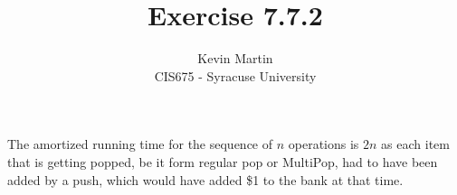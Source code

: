\documentclass{article}
\author{Kevin Martin\\ CIS675 - Syracuse University}
\title{Exercise 7.7.2}
\begin{document}
\maketitle
The amortized running time for the sequence of $n$ operations is $2n$ as each
item that is getting popped, be it form regular pop or MultiPop, had to have been
added by a push, which would have added \$1 to the bank at that time.
\end{document}
